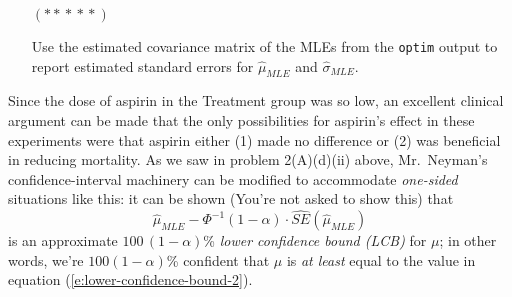 \documentclass[12pt]{article}
\begin{document}
\begin{itemize}
\begin{itemize}
\begin{itemize}
\item[$( * \! * \! * \! * \! * )$]

Use the estimated covariance matrix of the MLEs from the \texttt{optim} output to report estimated standard errors for $\hat{ \mu }_{ MLE }$ and $\hat{ \sigma }_{ MLE }$. \textit{\fbox{\textbf{[10 points]}}} \vspace*{0.025in} 

\end{itemize}

Since the dose of aspirin in the Treatment group was so low, an excellent clinical argument can be made that the only possibilities for aspirin's effect in these experiments were that aspirin either (1) made no difference or (2) was beneficial in reducing mortality. As we saw in problem 2(A)(d)(ii) above, Mr.~Neyman's confidence-interval machinery can be modified to accommodate \textit{one-sided} situations like this: it can be shown (You're not asked to show this) that
\begin{equation} \label{e:lower-confidence-bound-2}
\hat{ \mu }_{ MLE } - \Phi^{ -1 } ( 1 - \alpha ) \cdot \widehat{ SE } \left( \hat{ \mu }_{ MLE } \right)
\end{equation}
is an approximate $100 \, ( 1 - \alpha )$\% \textit{lower confidence bound (LCB)} for $\mu$; in other words, we're $100 ( 1 - \alpha )$\% confident that $\mu$ is \textit{at least} equal to the value in equation (\ref{e:lower-confidence-bound-2}). 


\end{itemize}
\end{itemize}
\end{document}
